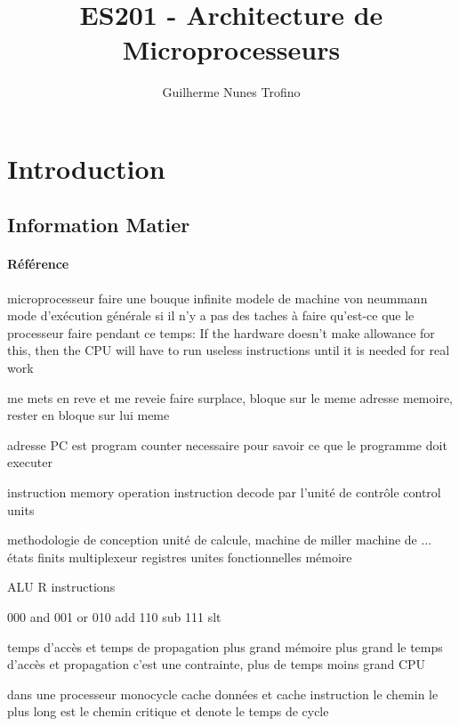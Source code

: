 \documentclass{article}
\title{ES201 - Architecture de Microprocesseurs}
\author{Guilherme Nunes Trofino}
\begin{document}
\maketitle
\setlength{\parindent}{0pt}

\newpage\tableofcontents

\section{Introduction}
% 
% 

% 

\subsection{Information Matier}
\paragraph{Référence}


microprocesseur faire une bouque infinite
modele de machine von neummann
mode d'exécution générale
si il n'y a pas des taches à faire qu'est-ce que le processeur faire pendant ce temps: If the hardware doesn't make allowance for this, then the CPU will have to run useless instructions until it is needed for real work

me mets en reve et me reveie 
faire surplace, bloque sur le meme adresse memoire, rester en bloque sur lui meme

adresse PC est program counter necessaire pour savoir ce que le programme doit executer

instruction memory
operation instruction decode par l'unité de contrôle control units


methodologie de conception
unité de calcule, machine de miller machine de ... états finits
multiplexeur
registres
unites fonctionnelles
mémoire

ALU
R instructions

000 and
001 or
010 add
110 sub
111 slt


temps d'accès et temps de propagation
plus grand mémoire plus grand le temps d'accès et propagation c'est une contrainte, plus de temps moins grand CPU


dans une processeur monocycle
cache données et cache instruction
le chemin le plus long est le chemin critique et denote le temps de cycle
\end{document}
